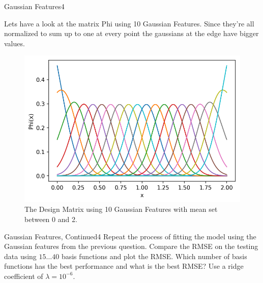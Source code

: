 \begin{questions}
\begin{question}{Gaussian Features}{4}
\begin{answer}
Lets have a look at the matrix Phi using 10 Gaussian Features. Since they're all normalized to sum up to one at every point the gaussians at the edge have bigger values.
\end{answer}
\begin{figure}[H]
	\includegraphics[width=0.7\linewidth]{pictures/Phi.png}
	\centering
	\caption{The Design Matrix using 10 Gaussian Features with mean set between 0 and 2.}
	\label{fig:phi}
\end{figure}


\end{question}


\begin{question}{Gaussian Features, Continued}{4}
Repeat the process of fitting the model using the Gaussian features from the previous question. Compare the RMSE on the testing data using $15 \ldots 40$ basis functions and plot the RMSE. Which number of basis functions has the best performance and what is the best RMSE? Use a ridge coefficient of $\lambda=10^{-6}$.


\end{question}
\end{questions}
